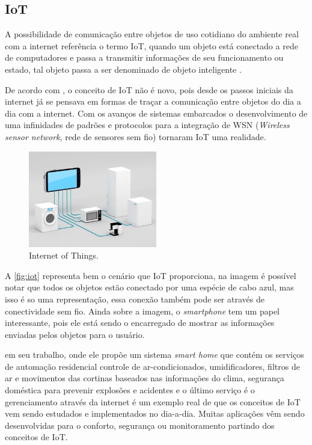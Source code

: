     \subsection{IoT}
    \par
    A possibilidade de comunicação entre objetos de uso cotidiano do ambiente real com a internet referência o termo IoT, quando um objeto está conectado a rede de computadores e passa a transmitir informações de seu funcionamento ou estado, tal objeto passa a ser denominado de objeto inteligente \cite{iot2016}.
    \par
    De acordo com , o conceito de IoT não é novo, pois desde os passos iniciais da internet já se
    pensava em formas de traçar a comunicação entre objetos do dia a dia com a internet. Com os avanços de sistemas embarcados o
    desenvolvimento de uma infinidades de padrões e protocolos para a integração de
    WSN (\textit{Wireless sensor network}, rede de sensores sem fio) tornaram IoT uma realidade.
    \begin{figure}[H]
              \caption{\label{fig:iot}{Internet of Things.}}
              \centering
              \includegraphics[width=0.5\textwidth]{Figuras/iot.png}
        \end{figure}
    \par

    A \autoref{fig:iot} representa bem o cenário que IoT proporciona, na imagem é possível notar que todos os objetos estão conectado por
    uma espécie de cabo azul, mas isso é so uma representação, essa conexão também pode ser através de conectividade sem fio. Ainda
    sobre a imagem, o \textit{smartphone} tem um papel interessante, pois ele está sendo o encarregado de mostrar as informações enviadas
    pelos objetos para o usuário.

     em seu trabalho, onde ele propõe um sistema \textit{smart home} que contém os serviços de automação residencial controle de ar-condicionados, umidificadores, filtros de ar e movimentos das cortinas baseados nas informações do clima, segurança doméstica para prevenir explosões e acidentes e o último serviço é o gerenciamento através da internet é um exemplo real de que os conceitos de IoT vem sendo estudados e implementados no dia-a-dia. Muitas aplicações vêm sendo desenvolvidas para o conforto, segurança ou monitoramento partindo dos conceitos de IoT.
    
